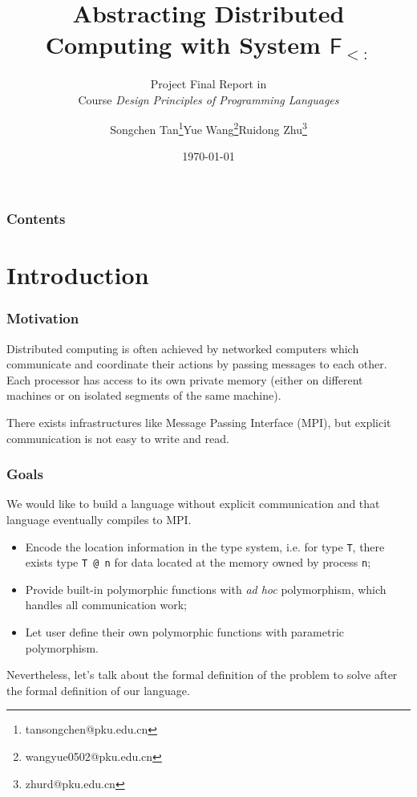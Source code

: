 \documentclass{beamer}
\title{Abstracting Distributed Computing with System $\mathsf{F_{<:}}$}
\subtitle{Project Final Report in \\ Course \emph{Design Principles of Programming Languages}}
\author[Tan, Wang and Zhu]{Songchen Tan\thanks{tansongchen@pku.edu.cn}\quad Yue Wang\thanks{wangyue0502@pku.edu.cn}\quad Ruidong Zhu\thanks{zhurd@pku.edu.cn}}
\institute[PKU]{\normalsize Peking University}
\date{\today}
\makeatletter
\newif\ifnottitlepage
\newenvironment{withoutheadline}{
        \setbeamertemplate{headline}[default]
        \def\beamer@entrycode{\vspace*{-\headheight}}
    }{}
\makeatother
\begin{document}
\begin{frame}
\titlepage
\end{frame}

\begin{frame}
\frametitle{Contents}
\tableofcontents
\end{frame}
\section{Introduction}
\begin{frame}
    \frametitle{Motivation}
    
    Distributed computing is often achieved by networked computers which communicate and coordinate their actions by passing messages to each other. Each processor has access to its own private memory (either on different machines or on isolated segments of the same machine).

    There exists infrastructures like Message Passing Interface (MPI), but explicit communication is not easy to write and read.
\end{frame}

\begin{frame}[fragile]
\frametitle{Goals}

We would like to build a language without explicit communication and that language eventually compiles to MPI.

\begin{itemize}
  \item Encode the location information in the type system, i.e. for type \verb|T|, there exists type \verb|T @ n| for data located at the memory owned by process \verb|n|;
  \item Provide built-in polymorphic functions with \emph{ad hoc} polymorphism, which handles all communication work;
  \item Let user define their own polymorphic functions with parametric polymorphism.
\end{itemize}

Nevertheless, let's talk about the formal definition of the problem to solve after the formal definition of our language.

\end{frame}
\end{document}
